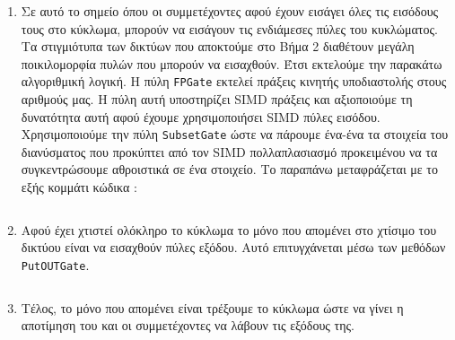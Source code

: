 \begin{enumerate}
    \begin{longlisting}
        \begin{center}
            \inputminted[fontsize=\scriptsize,frame=single]{cpp}{./01_body/code/aby-example-step-3.cpp}
        \end{center}
    \end{longlisting}
    Είναι σχεδόν προφανές ότι ο παραπάνω κώδικας μπορεί να βελτιωθεί θεωρώντας μια συνάρτηση και περνώντας σαν ορίσματα σε αυτή τα \texttt{N, X, incX} και \texttt{N, Y, incY}, ωστόσο για να μη γίνει δυσανάγνωστη η εργασία προτιμήσαμε την πιο απλή του μορφή\footnote{Βελτιστοποιήσεις όπως αυτή, αξιοποιούνται μαζικά στον κώδικα της MPC-BLAS, που θα εξετάσουμε στη συνέχεια, καθώς παρατηρήθηκε πως κατά την υλοποίηση της υπάρχει μεγάλη επαναληψημότητα αλγοριθμικής λογικής.}.
    \item Σε αυτό το σημείο όπου οι συμμετέχοντες αφού έχουν εισάγει όλες τις εισόδους τους στο κύκλωμα, μπορούν να εισάγουν τις ενδιάμεσες πύλες του κυκλώματος. Τα στιγμιότυπα των δικτύων που αποκτούμε στο Βήμα 2 διαθέτουν μεγάλη ποικιλομορφία πυλών που μπορούν να εισαχθούν. Έτσι εκτελούμε την παρακάτω αλγοριθμική λογική. Η πύλη \texttt{FPGate} εκτελεί πράξεις κινητής υποδιαστολής στους αριθμούς μας. Η πύλη αυτή υποστηρίζει SIMD πράξεις και αξιοποιούμε τη δυνατότητα αυτή αφού έχουμε χρησιμοποιήσει SIMD πύλες εισόδου. Χρησιμοποιούμε την πύλη \texttt{SubsetGate} ώστε να πάρουμε ένα-ένα τα στοιχεία του διανύσματος που προκύπτει από τον SIMD πολλαπλασιασμό προκειμένου να τα συγκεντρώσουμε αθροιστικά σε ένα στοιχείο. Το παραπάνω μεταφράζεται με το εξής κομμάτι κώδικα :
    \begin{longlisting}
        \begin{center}
            \inputminted[fontsize=\scriptsize,frame=single]{cpp}{./01_body/code/aby-example-step-4.cpp}
        \end{center}
    \end{longlisting}
    \item Αφού έχει χτιστεί ολόκληρο το κύκλωμα το μόνο που απομένει στο χτίσιμο του δικτύου είναι να εισαχθούν πύλες εξόδου. Αυτό επιτυγχάνεται μέσω των μεθόδων \texttt{PutOUTGate}.
    \begin{longlisting}
        \begin{center}
            \inputminted[fontsize=\scriptsize,frame=single]{cpp}{./01_body/code/aby-example-step-5.cpp}
        \end{center}
    \end{longlisting}
    \item Τέλος, το μόνο που απομένει είναι τρέξουμε το κύκλωμα ώστε να γίνει η αποτίμηση του και οι συμμετέχοντες να λάβουν τις εξόδους της.
    \begin{longlisting}
        \begin{center}
            \inputminted[fontsize=\scriptsize,frame=single]{cpp}{./01_body/code/aby-example-step-6.cpp}
        \end{center}
    \end{longlisting}
\end{enumerate}

